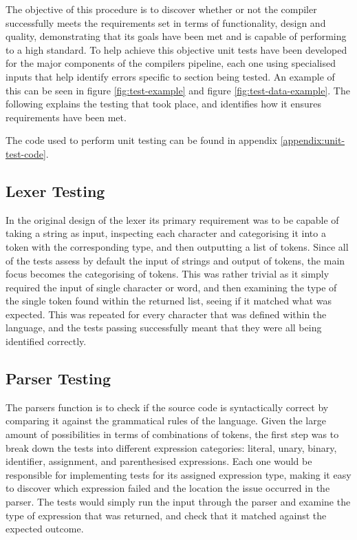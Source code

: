 \documentclass[
]{report}
\begin{document}
The objective of this procedure is to discover whether or not the
compiler successfully meets the requirements set in terms of
functionality, design and quality, demonstrating that its goals have
been met and is capable of performing to a high standard. To help
achieve this objective unit tests have been developed for the major
components of the compilers pipeline, each one using specialised inputs
that help identify errors specific to section being tested. An example of
this can be seen in figure \ref{fig:test-example} and figure \ref{fig:test-data-example}.
The following explains the testing that took place, and identifies how it
ensures requirements have been met.

The code used to perform unit testing can be found in appendix \ref{appendix:unit-test-code}.

\subsection{Lexer Testing}
In the original design of the lexer its primary requirement was to be
capable of taking a string as input, inspecting each character and
categorising it into a \gls{token} with the corresponding type, and then
outputting a list of \glspl{token}. Since all of the tests assess by default
the input of strings and output of \glspl{token}, the main focus becomes the
categorising of \glspl{token}. This was rather trivial as it simply required
the input of single character or word, and then examining the type of
the single \gls{token} found within the returned list, seeing if it matched
what was expected. This was repeated for every character that was
defined within the language, and the tests passing successfully meant
that they were all being identified correctly.

\subsection{Parser Testing}
The parsers function is to check if the source code is syntactically
correct by comparing it against the grammatical rules of the language.
Given the large amount of possibilities in terms of combinations of
\glspl{token}, the first step was to break down the tests into different
\gls{expression} categories: literal, unary, binary, \gls{identifier}, assignment,
and parenthesised \glspl{expression}. Each one would be responsible for
implementing tests for its assigned \gls{expression} type, making it easy to
discover which \gls{expression} failed and the location the issue occurred in
the parser. The tests would simply run the input through the parser and
examine the type of \gls{expression} that was returned, and check that it
matched against the expected outcome.
\end{document}
